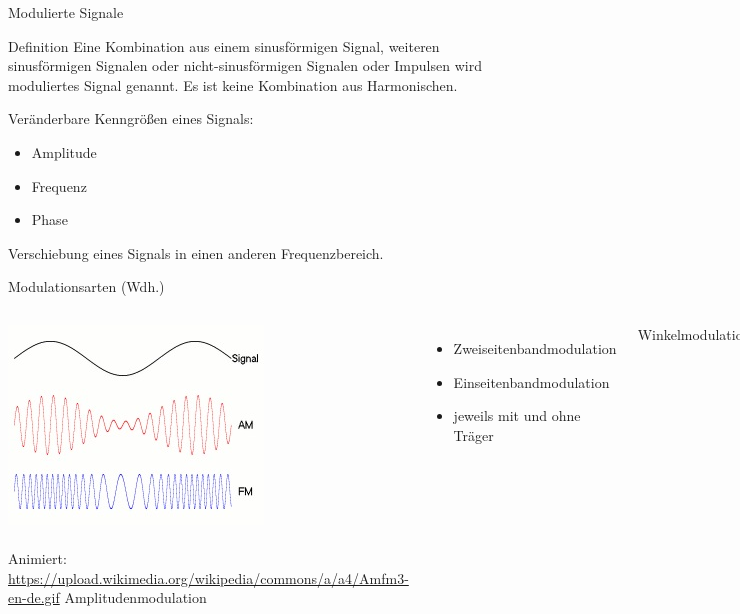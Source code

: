 \begin{frame}{Modulierte Signale}
  \begin{block}{Definition}
    Eine Kombination aus einem sinusförmigen Signal, weiteren sinusförmigen Signalen oder nicht-sinusförmigen Signalen oder Impulsen wird moduliertes Signal genannt. Es ist keine Kombination aus Harmonischen.
  \end{block}
  \vspace{2em}
  Veränderbare Kenngrößen eines Signals:
  \begin{itemize}
    \item Amplitude
    \item Frequenz
    \item Phase
  \end{itemize}
  \vspace{2em}
  Verschiebung eines Signals in einen anderen Frequenzbereich.
\end{frame}

\begin{frame}{Modulationsarten (Wdh.)}
  \begin{columns}[c]
    \includegraphics[width=\textwidth,height=.80\textheight,keepaspectratio]{e14/modulationen.jpg}\\
    {\tiny \hyperlink{refs}{\cite{wm}}}\\
    {\tiny Animiert: \url{https://upload.wikimedia.org/wikipedia/commons/a/a4/Amfm3-en-de.gif}}
    Amplitudenmodulation
    \begin{itemize}
      \item Zweiseitenbandmodulation
      \item Einseitenbandmodulation
      \item jeweils mit und ohne Träger
    \end{itemize}
    Winkelmodulation
    \begin{itemize}
      \item Frequenzmodulation
      \item Phasenmodulation
    \end{itemize}
  \end{columns}
\end{frame}

